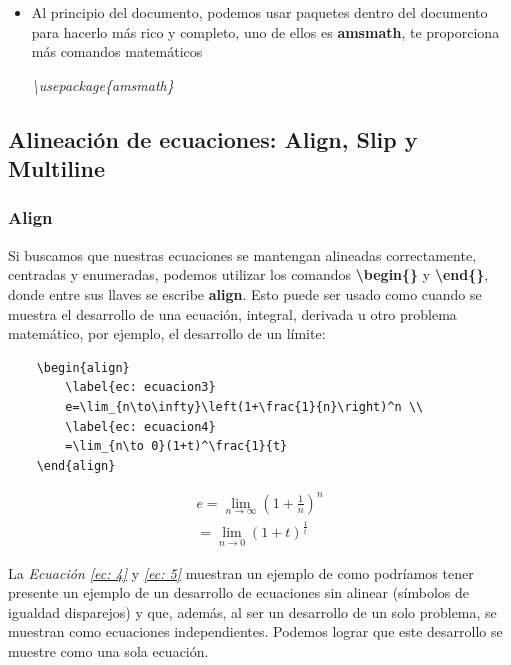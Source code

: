 \begin{itemize}
    \begin{center}
        \$\$\textbackslash{cdot}\$\$\\
        4\textbackslash{cdot}5
    \end{center}
    $$4\cdot5$$
    \item Al principio del documento, podemos usar paquetes dentro del documento para hacerlo más rico y completo, uno de ellos es \textbf{amsmath}, te proporciona más comandos matemáticos\begin{center}\textit{\textbackslash{usepackage\{amsmath\}}}\end{center}
\end{itemize}


\subsection{Alineación de ecuaciones: Align, Slip y Multiline}


\subsubsection{Align}
\hspace{0.55cm}Si buscamos que nuestras ecuaciones se mantengan alineadas correctamente, centradas y enumeradas, podemos utilizar los comandos \textbf{\textbackslash{begin\{\}}} y \textbf{\textbackslash{end\{\}}}, donde entre sus llaves se escribe \textbf{align}. Esto puede ser usado como cuando se muestra el desarrollo de una ecuación, integral, derivada u otro problema matemático, por ejemplo, el desarrollo de un límite:
\begin{lstlisting}
    \begin{align}
        \label{ec: ecuacion3}
        e=\lim_{n\to\infty}\left(1+\frac{1}{n}\right)^n \\
        \label{ec: ecuacion4}
        =\lim_{n\to 0}(1+t)^\frac{1}{t}
    \end{align}
\end{lstlisting}
\begin{align}
    \label{ec: 4}
    e=\lim_{n\to\infty}\left(1+\frac{1}{n}\right)^n\\
    \label{ec: 5}
    =\lim_{n\to 0}(1+t)^\frac{1}{t}
\end{align}

La \textit{Ecuación \ref{ec: 4}} y \textit{\ref{ec: 5}} muestran un ejemplo de como podríamos tener presente un ejemplo de un desarrollo de ecuaciones sin alinear (símbolos de igualdad disparejos) y que, además, al ser un desarrollo de un solo problema, se muestran como ecuaciones independientes. Podemos lograr que este desarrollo se muestre como una sola ecuación.



